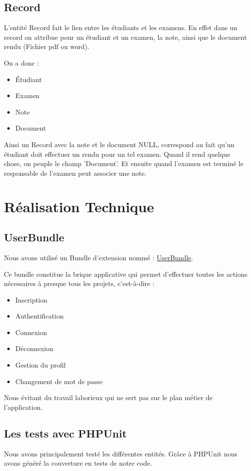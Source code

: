 \documentclass{report}
\begin{document}
    \subsection{Record}
			L'entité Record fait le lien entre les étudiants et les examens. En effet dans un record on attribue pour un étudiant et un examen, la note, ainsi que le document rendu (Fichier pdf ou word).

			On a donc :
			\begin{itemize}
				\item{Étudiant}
				\item{Examen}
				\item{Note}
				\item{Document}
			\end{itemize}

			Ainsi un Record avec la note et le document NULL, correspond au fait qu'un étudiant doit effectuer un rendu pour un tel examen. Quand il rend quelque chose, on peuple le champ 'Document'. Et ensuite quand l'examen est terminé le responsable de l'examen peut associer une note.


  \section{Réalisation Technique}
    \subsection{UserBundle}
      Nous avons utilisé un Bundle d'extension nommé : 
      \href{https://github.com/FriendsOfSymfony/FOSUserBundle}{UserBundle}.
      
      Ce bundle constitue la brique applicative qui permet d'effectuer toutes les actions nécessaires à presque tous les projets, c'est-à-dire :
      \begin{itemize}
        \item{Inscription}
        \item{Authentification}
        \item{Connexion}
        \item{Déconnexion}
        \item{Gestion du profil}
        \item{Changement de mot de passe}
      \end{itemize}
      Nous évitant du travail laborieux qui ne sert pas sur le plan métier de l'application.

    \subsection{Les tests avec PHPUnit}
			Nous avons principalement testé les différentes entités. Grâce à PHPUnit nous avons généré la couverture en tests de notre code.
\end{document}
